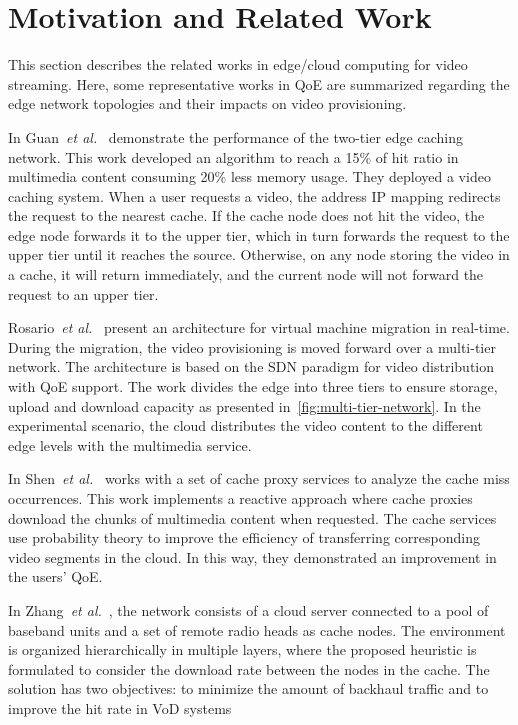 \section{Motivation and Related Work}
\label{sec:related-work}

This section describes the related works in edge/cloud computing for video streaming. Here, some representative works in QoE are summarized regarding the edge network topologies and their impacts on video provisioning.

In Guan~\textit{et al.}~\cite{guan:2019:CLC} demonstrate the performance of the two-tier edge caching network. This work developed an algorithm to reach a 15\% of hit ratio in multimedia content consuming 20\% less memory usage. They deployed a video caching system. When a user requests a video, the address IP mapping redirects the request to the nearest cache.
If the cache node does not hit the video, the edge node forwards it to the upper tier, which in turn forwards the request to the upper tier until it reaches the source. Otherwise, on any node storing the video in a cache, it will return immediately, and the current node will not forward the request to an upper tier.

Rosario~\textit{et al.}~\cite{rosarioSENSORS2018} present an architecture for virtual machine migration in real-time. During the migration, the video provisioning is moved forward over a multi-tier network. The architecture is based on the SDN paradigm for video distribution with QoE support. The work divides the edge into three tiers to ensure storage, upload and download capacity as presented in~\ref{fig:multi-tier-network}. In the experimental scenario, the cloud distributes the video content to the different edge levels with the multimedia service.

In Shen~\textit{et al.}~\cite{shenIWQoS19} works with a set of cache proxy services to analyze the cache miss occurrences. This work implements a reactive approach where cache proxies download the chunks of multimedia content when requested. The cache services use probability theory to improve the efficiency of transferring corresponding video segments in the cloud. In this way, they demonstrated an improvement in the users' QoE.

In Zhang~\textit{et al.}~\cite{zhang:WCNC2017}, the network consists of a cloud server connected to a pool of baseband units and a set of remote radio heads as cache nodes. The environment is organized hierarchically in multiple layers, where the proposed heuristic is formulated to consider the download rate between the nodes in the cache. The solution has two objectives: to minimize the amount of backhaul traffic and to improve the hit rate in VoD systems

